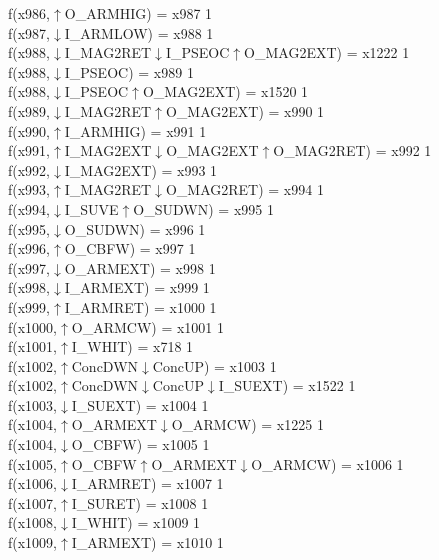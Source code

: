 f(x986,$\uparrow$O\_ARMHIG) = x987 {1} \\
f(x987,$\downarrow$I\_ARMLOW) = x988 {1} \\
f(x988,$\downarrow$I\_MAG2RET$\downarrow$I\_PSEOC$\uparrow$O\_MAG2EXT) = x1222 {1} \\
f(x988,$\downarrow$I\_PSEOC) = x989 {1} \\
f(x988,$\downarrow$I\_PSEOC$\uparrow$O\_MAG2EXT) = x1520 {1} \\
f(x989,$\downarrow$I\_MAG2RET$\uparrow$O\_MAG2EXT) = x990 {1} \\
f(x990,$\uparrow$I\_ARMHIG) = x991 {1} \\
f(x991,$\uparrow$I\_MAG2EXT$\downarrow$O\_MAG2EXT$\uparrow$O\_MAG2RET) = x992 {1} \\
f(x992,$\downarrow$I\_MAG2EXT) = x993 {1} \\
f(x993,$\uparrow$I\_MAG2RET$\downarrow$O\_MAG2RET) = x994 {1} \\
f(x994,$\downarrow$I\_SUVE$\uparrow$O\_SUDWN) = x995 {1} \\
f(x995,$\downarrow$O\_SUDWN) = x996 {1} \\
f(x996,$\uparrow$O\_CBFW) = x997 {1} \\
f(x997,$\downarrow$O\_ARMEXT) = x998 {1} \\
f(x998,$\downarrow$I\_ARMEXT) = x999 {1} \\
f(x999,$\uparrow$I\_ARMRET) = x1000 {1} \\
f(x1000,$\uparrow$O\_ARMCW) = x1001 {1} \\
f(x1001,$\uparrow$I\_WHIT) = x718 {1} \\
f(x1002,$\uparrow$ConcDWN$\downarrow$ConcUP) = x1003 {1} \\
f(x1002,$\uparrow$ConcDWN$\downarrow$ConcUP$\downarrow$I\_SUEXT) = x1522 {1} \\
f(x1003,$\downarrow$I\_SUEXT) = x1004 {1} \\
f(x1004,$\uparrow$O\_ARMEXT$\downarrow$O\_ARMCW) = x1225 {1} \\
f(x1004,$\downarrow$O\_CBFW) = x1005 {1} \\
f(x1005,$\uparrow$O\_CBFW$\uparrow$O\_ARMEXT$\downarrow$O\_ARMCW) = x1006 {1} \\
f(x1006,$\downarrow$I\_ARMRET) = x1007 {1} \\
f(x1007,$\uparrow$I\_SURET) = x1008 {1} \\
f(x1008,$\downarrow$I\_WHIT) = x1009 {1} \\
f(x1009,$\uparrow$I\_ARMEXT) = x1010 {1} \\
